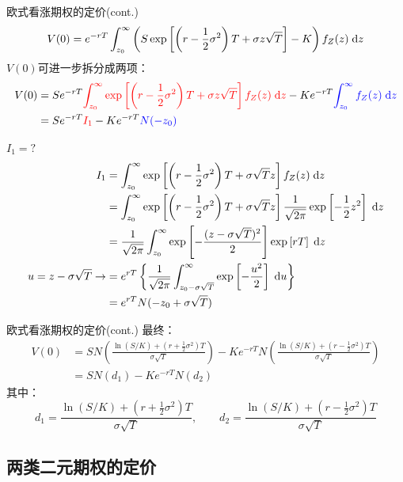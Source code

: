 \documentclass[t]{beamer}
\newcommand{\dif}{{\;\rm d}}
\begin{document}
\begin{frame}{欧式看涨期权的定价(cont.)}
\[V(0)=e^{-rT} \int^{\infty}_{z_0} \left( S\exp\left[\left( r-\frac{1}{2}\sigma^2\right)  T+\sigma z \sqrt{T}\right]-K\right) f_Z(z)\dif z\]
$V(0)$可进一步拆分成两项：
\[\begin{split}
V(0)&=Se^{-rT} {\color{red}\int^{\infty}_{z_0}  \exp\left[\left( r-\frac{1}{2}\sigma^2\right)  T
+\sigma z \sqrt{T}\right]f_Z(z)\dif z}
-Ke^{-rT}{\color{blue}\int^{\infty}_{z_0}  f_Z(z)\dif z}\\
&=Se^{-rT} {\color{red}I_1}-Ke^{-rT}{\color{blue}N(-z_0)}
\end{split} \]
\end{frame}

\begin{frame}{$I_1=?$}
\[\begin{split}
I_1&=\int^{\infty}_{z_0} \exp\left[\left(r-\frac{1}{2}\sigma^2 \right) T+\sigma \sqrt{T} z\right]f_Z(z)\dif z\\
&=\int^{\infty}_{z_0} \exp\left[\left(r-\frac{1}{2}\sigma^2 \right) T+\sigma \sqrt{T} z\right]\frac{1}{\sqrt{2\pi}}\exp\left[-\frac{1}{2}z^2\right] \dif z\\
&=\frac{1}{\sqrt{2\pi}}\int^{\infty}_{z_0}\exp\left[-\frac{(z-\sigma\sqrt{T})^2}{2}\right]\exp\left[rT\right]\dif z\\
u=z-\sigma\sqrt{T} \to &={e^{rT}}\left\{\frac{1}{\sqrt{2\pi}}\int^{\infty}_{z_0-\sigma\sqrt{T}}\exp\left[-\frac{u^2}{2}\right]\dif u\right\}\\
&={e^{rT}}N(-z_0+\sigma\sqrt{T})
\end{split} \]
\end{frame}

\begin{frame}{欧式看涨期权的定价(cont.)}
最终：
\begin{equation*}
\begin{split}
V(0)&=SN\left(\frac{\ln(S/K)+(r+\frac{1}{2}\sigma^2)T}{\sigma\sqrt{T}} \right)-Ke^{-rT} N\left(\frac{\ln(S/K)+(r-\frac{1}{2}\sigma^2)T}{\sigma\sqrt{T}} \right) \\
&=SN(d_1)-Ke^{-rT}N(d_2)
\end{split}
\end{equation*}
其中：
\[d_1=\frac{\ln \left( S/K \right) +\left( r+\frac{1}{2}\sigma ^2 \right) T}{\sigma \sqrt{T}},\qquad d_2=\frac{\ln \left( S/K \right) +\left( r-\frac{1}{2}\sigma ^2 \right) T}{\sigma \sqrt{T}} \]
\end{frame}


\subsection{两类二元期权的定价}
\end{document}
